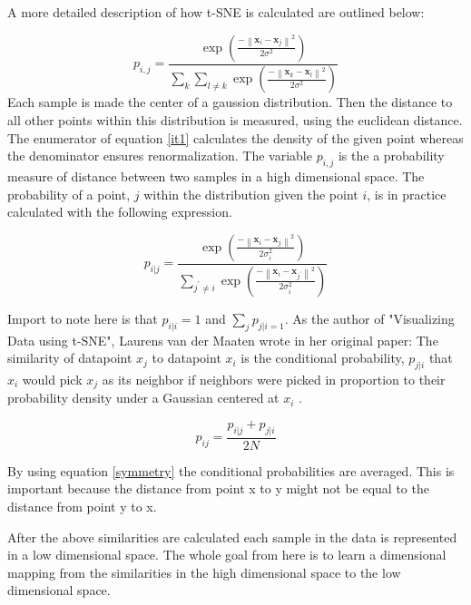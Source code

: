 \documentclass[12pt, fleqn, titlepage]{article}
\newcommand{\norm}[1]{\left\lVert#1\right\rVert}
\newcommand{\1}[1]{\mathds{1}\left[#1\right]}
\begin{document}
A more detailed description of how t-SNE is calculated are outlined below:

\begin{equation}\label{it1}
		p_{i,j} = \frac{\exp(\frac{-\norm{\mathbf x_i - \mathbf x_j}^2}{2 \sigma^2})}{\sum_{k} \sum_{l \neq k} \exp (\frac{-\norm{\mathbf x_k - \mathbf x_l}^2}{2 \sigma^2})}
\end{equation}
Each sample is made the center of a gaussion distribution. Then the distance to all other points within this distribution is measured, using the euclidean distance. The enumerator of equation \eqref{it1} calculates the density of the given point whereas the denominator ensures renormalization. The variable $ p_{i,j} $ is the a probability measure of distance between two samples in a high dimensional space. The probability of a point, $ j $ within the distribution given the point $ i $, is in practice calculated with the following expression.

\begin{equation*}\label{key}
	p_{i \vert j} = \frac{\exp(\frac{-\norm{\mathbf x_i - \mathbf x_j}^2}{2 \sigma_i^2})}{\sum_{j^\prime \neq i} \exp (\frac{-\norm{\mathbf x_i - \mathbf x_{j^\prime}}^2}{2 \sigma_i^2})}
\end{equation*}

Import to note here is that $ p_{i \vert i} = 1$  and $ \sum_{j} p_{j \vert i = 1}$. As the author of "Visualizing Data using t-SNE", Laurens van der Maaten  wrote in her original paper: The similarity of datapoint $ x_j $ to datapoint $ x_i $ is the conditional probability, $ p_{j \vert i} $  that $ x_i $ would pick $ x_j $ as its neighbor if neighbors were picked in proportion to their probability density under a Gaussian centered at $  x_i $ \cite{tsne}.

\begin{equation}\label{symmetry}
	p_{ij} = \frac{	p_{i \vert j} + p_{j \vert i}}{2N}
\end{equation}

By using equation \eqref{symmetry} the conditional probabilities are averaged. This is important because the distance from point x to y might not be equal to the distance from point y to x. 

After the above similarities are calculated each sample in the data is represented in a low dimensional space. The whole goal from here is to learn a dimensional mapping from the similarities in the high dimensional space to the low dimensional space.
\end{document}
